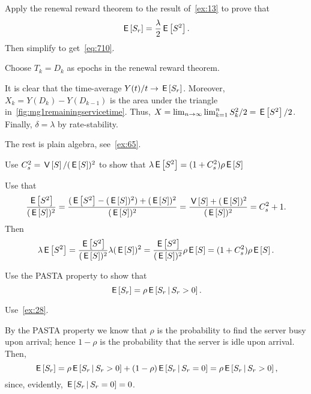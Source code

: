 \begin{exercise}
Apply the renewal reward theorem to the result of~\cref{ex:13} to prove that 
\begin{equation}\label{eq:34}
\,\mathsf{E}\left[S_r\right] = \frac{\lambda}2 \,\mathsf{E}\left[S^2\right]. 
\end{equation}
Then simplify to get~\cref{eq:710}. 
\begin{hint}
 Choose $T_k=D_k$ as epochs in the renewal reward theorem.
\end{hint}
\begin{solution}
 It is clear that the time-average $Y(t)/t \to \,\mathsf{E}\left[S_r\right]$.
 Moreover, $X_k = Y(D_k) - Y(D_{k-1})$ is the area under the triangle in~\cref{fig:mg1remainingservicetime}.
 Thus, $X=\lim_{n\to\infty} \lim_{k=1}^n S_k^2/ 2 = \,\mathsf{E}\left[S^2\right]/2$.
 Finally, $\delta = \lambda$ by rate-stability.

 The rest is plain algebra, see~\cref{ex:65}.
\end{solution}
\end{exercise}

\begin{extra}
Use $C_s^2 = \,\mathsf{V}\left[S\right] / (\,\mathsf{E}\left[S\right])^2$ to show that $\lambda \,\mathsf{E}\left[S^2\right] = (1+C_s^2)\rho\,\mathsf{E}\left[S\right]$
\begin{solution}
Use that 
\begin{equation*}
 \frac{\,\mathsf{E}\left[S^2\right]}{(\,\mathsf{E}\left[S\right])^2} = 
 \frac{(\,\mathsf{E}\left[S^2\right]-(\,\mathsf{E}\left[S\right])^2) + (\,\mathsf{E}\left[S\right])^2}{(\,\mathsf{E}\left[S\right])^2} =
 \frac{\,\mathsf{V}\left[S\right] + (\,\mathsf{E}\left[S\right])^2}{(\,\mathsf{E}\left[S\right])^2} =
 C_s^2 + 1.
\end{equation*}
Then
\begin{equation*}
 \lambda\,\mathsf{E}\left[S^2\right] = \frac{\,\mathsf{E}\left[S^2\right]}{(\,\mathsf{E}\left[S\right])^2} \lambda(\,\mathsf{E}\left[S\right])^2=
 \frac{\,\mathsf{E}\left[S^2\right]}{(\,\mathsf{E}\left[S\right])^2} \rho \,\mathsf{E}\left[S\right] = (1+C_s^2) \rho \,\mathsf{E}\left[S\right].
\end{equation*}
\end{solution}
\end{extra}



\begin{extra}
Use the PASTA property to show that
\begin{equation}\label{eq:37}
\,\mathsf{E}\left[S_r\right] = \rho \,\mathsf{E}\left[S_r\,\middle|\, S_r>0\right].
\end{equation}
\begin{hint}
 Use~\cref{ex:28}.
\end{hint}
\begin{solution}
By the PASTA property we know that $\rho$ is the probability to find the server busy upon arrival; hence $1- \rho$ is the probability that the server is idle upon arrival. Then,
\begin{equation*}
\,\mathsf{E}\left[S_r\right] = \rho \,\mathsf{E}\left[S_r\,\middle|\, S_r >0\right] + (1-\rho) \,\mathsf{E}\left[S_r\,\middle|\, S_r = 0\right] = \rho \,\mathsf{E}\left[S_r\,\middle|\, S_r>0\right],
\end{equation*}
since, evidently, $\,\mathsf{E}\left[S_r\,\middle|\, S_r=0\right]=0$. 
\end{solution}
\end{extra}

